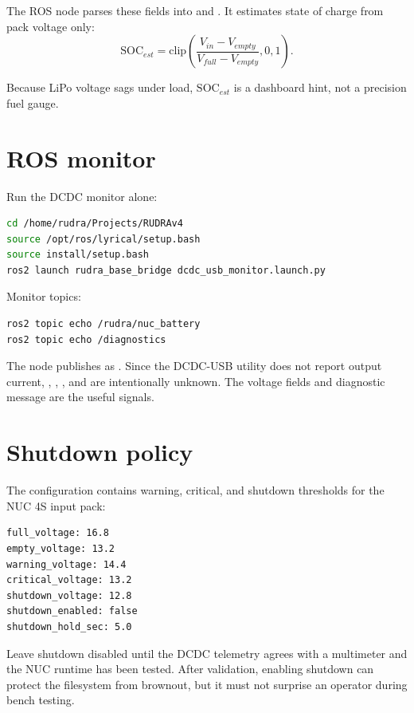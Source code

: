 The ROS node parses these fields into  and .  It estimates state of charge from pack voltage only:
\begin{equation}
\mathrm{SOC}_{est}=\mathrm{clip}\left(\frac{V_{in}-V_{empty}}{V_{full}-V_{empty}},0,1\right).
\end{equation}

Because LiPo voltage sags under load, \(\mathrm{SOC}_{est}\) is a dashboard hint, not a precision fuel gauge.

\section{ROS monitor}
Run the DCDC monitor alone:

\begin{lstlisting}[language=bash,caption={Launch the standalone DCDC monitor.}]
cd /home/rudra/Projects/RUDRAv4
source /opt/ros/lyrical/setup.bash
source install/setup.bash
ros2 launch rudra_base_bridge dcdc_usb_monitor.launch.py
\end{lstlisting}

Monitor topics:

\begin{lstlisting}[language=bash,caption={DCDC monitor topics.}]
ros2 topic echo /rudra/nuc_battery
ros2 topic echo /diagnostics
\end{lstlisting}

The node publishes  as .  Since the DCDC-USB utility does not report output current, , , , and  are intentionally unknown.  The voltage fields and diagnostic message are the useful signals.

\section{Shutdown policy}
The configuration contains warning, critical, and shutdown thresholds for the NUC 4S input pack:

\begin{lstlisting}[caption={DCDC monitor safety thresholds.}]
full_voltage: 16.8
empty_voltage: 13.2
warning_voltage: 14.4
critical_voltage: 13.2
shutdown_voltage: 12.8
shutdown_enabled: false
shutdown_hold_sec: 5.0
\end{lstlisting}

Leave shutdown disabled until the DCDC telemetry agrees with a multimeter and the NUC runtime has been tested.  After validation, enabling shutdown can protect the filesystem from brownout, but it must not surprise an operator during bench testing.

